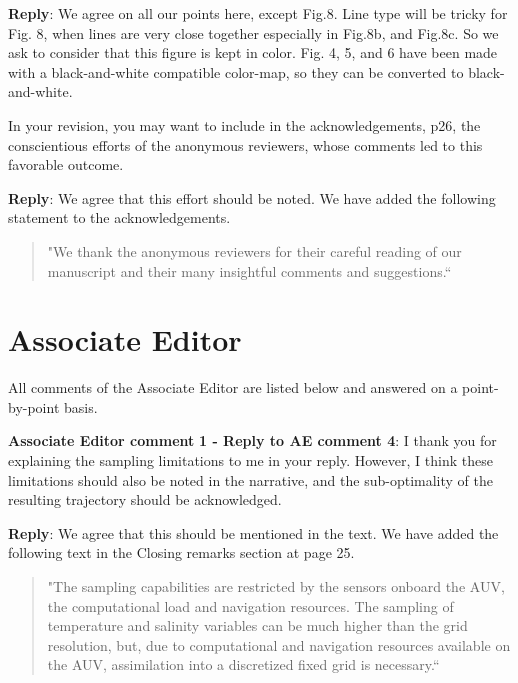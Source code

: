 \documentclass[a4paper]{article}
\newcounter{reviewer}
\def\aecom{\textbf{Associate Editor comment }}
\def\reply{\textbf{Reply}}
\begin{document}
\vspace{5mm}
\reply: We agree on all our points here, except Fig.8. Line type will be tricky for Fig. 8, when lines are very close together especially in Fig.8b, and Fig.8c. So we ask to consider that this figure is kept in color. Fig. 4, 5, and 6 have been made with a black-and-white compatible color-map, so they can be converted to black-and-white. 

\vspace{5mm}
 In your revision, you may want to include in the
acknowledgements, p26, the conscientious efforts of the anonymous
reviewers, whose comments led to this favorable outcome.

\vspace{5mm}
\reply: We agree that this effort should be noted. We have added the following statement to the acknowledgements.

\begin{quote}
"We thank the anonymous reviewers for their careful reading of our manuscript and their many insightful comments and suggestions.``
\end{quote}

 \section*{Associate Editor}
All comments of the Associate Editor are listed below and answered on a point-by-point basis.

\setcounter{reviewer}{1}

\vspace{5mm}
\noindent \aecom \textbf{1 - Reply to AE comment 4}: 
I thank you for explaining the sampling limitations to me in your reply.  However, I think these limitations should also be noted in the narrative, and the sub-optimality of the resulting trajectory should be acknowledged.

\vspace{5mm}
\reply: We agree that this should be mentioned in the text. We have added the following text in the Closing remarks section at page 25.

\begin{quote}
    "The sampling capabilities are restricted by the sensors onboard the AUV, the computational load and navigation resources. The sampling of temperature and salinity variables can be much higher than the grid resolution, but, due to computational and navigation resources available on the AUV, assimilation into a discretized fixed grid is necessary.``
\end{quote}
\end{document}
